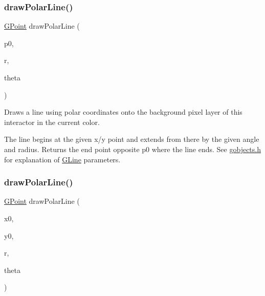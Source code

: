 \mbox{\label{classGDrawingSurface_af70cce1e4f708f1ed5b6f29cecb660e7}} 
\subsubsection{\texorpdfstring{draw\+Polar\+Line()}{drawPolarLine()}\hspace{0.1cm}{\footnotesize\ttfamily [1/2]}}
{\footnotesize\ttfamily \mbox{\hyperlink{structGPoint}{G\+Point}} draw\+Polar\+Line (\begin{DoxyParamCaption}\item[{const \mbox{\hyperlink{structGPoint}{G\+Point}} \&}]{p0,  }\item[{double}]{r,  }\item[{double}]{theta }\end{DoxyParamCaption})\hspace{0.3cm}{\ttfamily [virtual]}}



Draws a line using polar coordinates onto the background pixel layer of this interactor in the current color. 

The line begins at the given x/y point and extends from there by the given angle and radius. Returns the end point opposite p0 where the line ends. See \mbox{\hyperlink{gobjects_8h_source}{gobjects.\+h}} for explanation of \mbox{\hyperlink{classGLine}{G\+Line}} parameters. \mbox{\label{classGDrawingSurface_ad3e646f90005295f2bbdf37d2bcb39d2}} 
\subsubsection{\texorpdfstring{draw\+Polar\+Line()}{drawPolarLine()}\hspace{0.1cm}{\footnotesize\ttfamily [2/2]}}
{\footnotesize\ttfamily \mbox{\hyperlink{structGPoint}{G\+Point}} draw\+Polar\+Line (\begin{DoxyParamCaption}\item[{double}]{x0,  }\item[{double}]{y0,  }\item[{double}]{r,  }\item[{double}]{theta }\end{DoxyParamCaption})\hspace{0.3cm}{\ttfamily [virtual]}}



